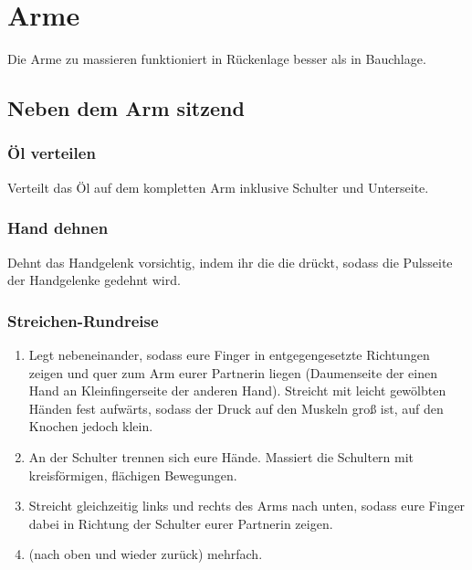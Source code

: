 \section{Arme}
Die Arme zu massieren funktioniert in Rückenlage besser als in Bauchlage.

\subsection{Neben dem Arm sitzend}

\subsubsection{Öl verteilen}
Verteilt das Öl auf dem kompletten Arm inklusive Schulter und Unterseite.

\subsubsection{Hand dehnen}
Dehnt das Handgelenk vorsichtig, indem ihr die die  drückt, sodass die Pulsseite der Handgelenke gedehnt wird.

\subsubsection{Streichen-Rundreise}
\begin{oframed}
  \begin{enumerate}
    \item {} Legt  nebeneinander, sodass eure Finger in entgegengesetzte Richtungen zeigen und quer zum Arm eurer Partnerin liegen (Daumenseite der einen Hand an Kleinfingerseite der anderen Hand). Streicht mit leicht gewölbten Händen fest aufwärts, sodass der Druck auf den Muskeln groß ist, auf den Knochen jedoch klein.
    \item {} An der Schulter trennen sich eure Hände. Massiert die Schultern mit kreisförmigen, flächigen Bewegungen.
    \item {} Streicht gleichzeitig links und rechts des Arms nach unten, sodass eure Finger dabei in Richtung der Schulter eurer Partnerin zeigen.
    \item {} (nach oben und wieder zurück) mehrfach.
  \end{enumerate}
\end{oframed}

